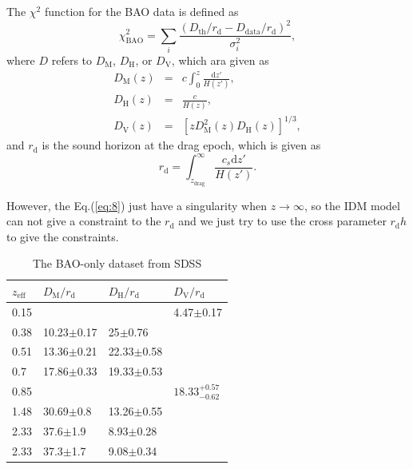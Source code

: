 \documentclass[twocolumn]{aastex631}
\begin{document}
   The $\chi^2$ function for the BAO data is defined as
   \begin{equation}
      \chi_{\text{BAO}}^2=\sum_i\frac{(D_{\text{th}}/r_{\text{d}}-D_{\text{data}}/r_{\text{d}})^2}{\sigma_i^2},
   \end{equation}
   where $D$ refers to $D_{\text{M}}$, $D_{\text{H}}$, or $D_{\text{V}}$, which ara given as
   \begin{eqnarray}
      D_{\text{M}}(z)&=&c\int_0^z\frac{\text{d}z'}{H(z')},\\
      D_{\text{H}}(z)&=&\frac{c}{H(z)},\\
      D_{\text{V}}(z)&=&\left[zD_{\text{M}}^2(z)D_{\text{H}}(z)\right]^{1/3},
   \end{eqnarray}
   and $r_{\text{d}}$ is the sound horizon at the drag epoch, which is given as
   \begin{equation}
      r_{\text{d}}=\int_{z_{\text{drag}}}^{\infty}\frac{c_s\text{d}z'}{H(z')}.
   \end{equation}

   However, the Eq.(\ref{eq:8}) just have a singularity when $z\to\infty$, so the IDM
   model can not give a constraint to the $r_{\text{d}}$ and we just try to use the cross
   parameter $r_{\text{d}}h$ to give the constraints.

   \begin{table}[htbp]
      \caption{The BAO-only dataset from SDSS}
      \centering
      \begin{tabular}{llll}
         \hline\hline
         $z_{\text{eff}}$ & $D_{\text{M}}/r_{\text{d}}$ & $D_{\text{H}}/r_{\text{d}}$ & $D_{\text{V}}/r_{\text{d}}$ \\
         \hline
         0.15 & & & 4.47$\pm$0.17 \\
         0.38 & 10.23$\pm$0.17 & 25$\pm$0.76 & \\
         0.51 & 13.36$\pm$0.21 & 22.33$\pm$0.58 & \\
         0.7 & 17.86$\pm$0.33 & 19.33$\pm$0.53 & \\
         0.85 & & & $18.33_{-0.62}^{+0.57}$ \\
         1.48 & 30.69$\pm$0.8 & 13.26$\pm$0.55 & \\
         2.33 & 37.6$\pm$1.9 & 8.93$\pm$0.28 & \\
         2.33 & 37.3$\pm$1.7 & 9.08$\pm$0.34 & \\
         \hline
      \end{tabular}
      \label{tab:2}
   \end{table}
\end{document}

